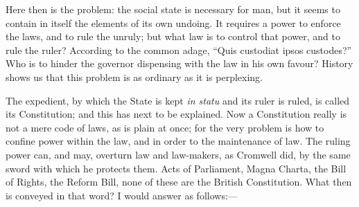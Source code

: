 Here then is the problem: the social state is
necessary for man, but it seems to contain in itself the elements of
its own undoing. It requires a power to enforce the laws, and to rule
the unruly; but what law is to control that power, and to rule the
ruler? According to the common adage, ``Quis custodiat ipsos custodes?''
Who is to hinder the governor dispensing with the law in his own
favour? History shows us that this problem is as ordinary as it is
perplexing.

The expedient, by which the State is kept \emph{in
statu} and its ruler is ruled, is called its Constitution; and this
has next to be explained. Now a Constitution really is not a mere code
of laws, as is plain at once; for the very problem is how to confine
power within the law, and in order to the maintenance of law. The
ruling power can, and may, overturn law and law-makers, as Cromwell
did, by the same sword with which he protects them. Acts of
Parliament, Magna Charta, the Bill of Rights, the Reform Bill, none of
these are the British Constitution. What then is conveyed in
that word? I would answer as follows:—

